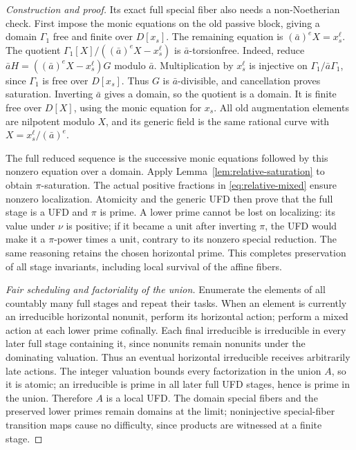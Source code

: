 \documentclass[11pt,reqno]{amsart}
\numberwithin{equation}{section}
\theoremstyle{plain}
\theoremstyle{definition}
\theoremstyle{remark}
\begin{document}
\begin{proof}[Construction and proof]
Its exact full special fiber also needs a non-Noetherian check.
First impose the monic equations on the old passive block, giving
a domain \(\Gamma_1\) free and finite over \(D[x_s]\).  The
remaining equation is \((\bar a)^eX=x_s^\ell\).  The quotient
\(\Gamma_1[X]/((\bar a)^eX-x_s^\ell)\) is
\(\bar a\)-torsionfree.  Indeed, reduce
\(\bar a H=((\bar a)^eX-x_s^\ell)G\) modulo \(\bar a\).
Multiplication by \(x_s^\ell\) is injective on
\(\Gamma_1/\bar a\Gamma_1\), since \(\Gamma_1\) is free
over \(D[x_s]\).  Thus \(G\) is \(\bar a\)-divisible,
and cancellation proves saturation.  Inverting \(\bar a\)
gives a domain, so the quotient is a domain.  It is finite free
over \(D[X]\), using the monic equation for \(x_s\).  All old
augmentation elements are nilpotent modulo \(X\), and its
generic field is the same rational curve with
\(X=x_s^\ell/(\bar a)^e\).

The full reduced sequence is the successive monic equations
followed by this nonzero equation over a domain.  Apply
Lemma~\ref{lem:relative-saturation} to obtain \(\pi\)-saturation.
The actual positive fractions in \eqref{eq:relative-mixed} ensure
nonzero localization.  Atomicity and the generic UFD then prove
that the full stage is a UFD and \(\pi\) is prime.  A lower
prime cannot be lost on localizing: its value under \(\nu\) is
positive; if it became a unit after inverting \(\pi\), the UFD
would make it a \(\pi\)-power times a unit, contrary to its
nonzero special reduction.  The same reasoning retains the
chosen horizontal prime.  This completes preservation of all
stage invariants, including local survival of the affine fibers.

\smallskip\noindent\emph{Fair scheduling and factoriality of the union.}
Enumerate the elements of all countably many full stages and
repeat their tasks.  When an element is currently an irreducible
horizontal nonunit, perform its horizontal action; perform a
mixed action at each lower prime cofinally.  Each final
irreducible is irreducible in every later full stage containing
it, since nonunits remain nonunits under the dominating valuation.
Thus an eventual horizontal irreducible receives arbitrarily
late actions.  The integer valuation bounds every factorization
in the union \(A\), so it is atomic; an irreducible is prime
in all later full UFD stages, hence is prime in the union.
Therefore \(A\) is a local UFD.  The domain special fibers
and the preserved lower primes remain domains at the limit;
noninjective special-fiber transition maps cause no difficulty,
since products are witnessed at a finite stage.


\end{proof}
\end{document}
